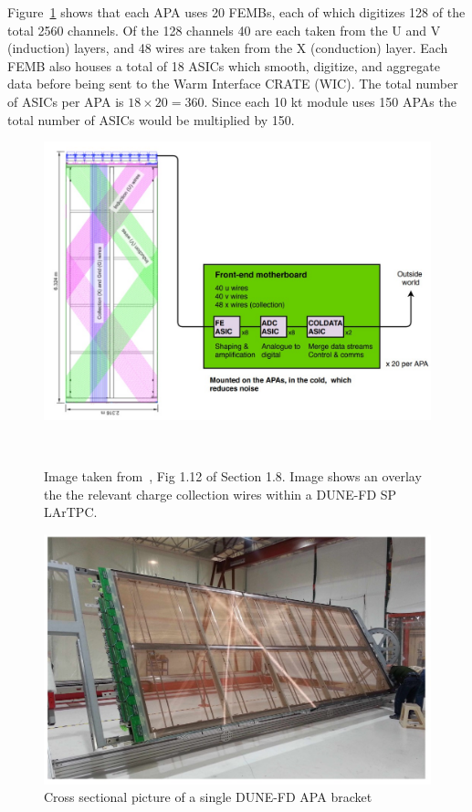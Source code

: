 Figure~\ref{fig:dune_tpc_electronics} shows that each APA uses 20 FEMBs, each of which digitizes 128 of the total 2560 channels.
Of the 128 channels 40 are each taken from the U and V (induction) layers, and 48 wires are taken from the X (conduction) layer.
Each FEMB also houses a total of 18 ASICs which smooth, digitize, and aggregate data before being sent to the Warm Interface CRATE (WIC).
The total number of ASICs per APA is $18\times 20 = 360$.
Since each 10 kt module uses 150 APAs the total number of ASICs would be multiplied by 150.

\begin{figure}[]
\centering
\includegraphics[width=\textwidth]{images/dune_apa_motherboards.jpg}
\caption{Image taken from~\citep{DUNE-FD_TDRv4:Abi_2020}, Fig 1.12 of Section 1.8.
Image shows an overlay the the relevant charge collection wires within a DUNE-FD SP LArTPC.
}~\label{fig:dune_tpc_electronics}
\end{figure}

\begin{figure}[]
\centering
\includegraphics[width=\textwidth]{images/dune_fd_tdr_apa_image.jpg}
\caption{Cross sectional picture of a single DUNE-FD APA bracket~\citep{DUNE-FD_TDRv4:Abi_2020}}
\label{fig:dune_apa_tdr}
\end{figure}


